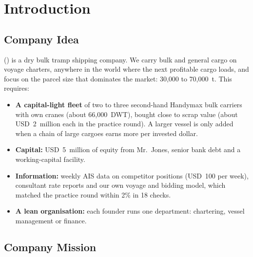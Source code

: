 \chapter{Introduction}\label{ch:introduction}

\section{Company Idea}\label{sec:idea}

\company{} (\companyshort{}) is a dry bulk tramp shipping company. We carry bulk and general cargo on voyage charters, anywhere in the world where the next profitable cargo loads, and focus on the parcel size that dominates the market: 30,000 to 70,000~t. This requires:
\begin{itemize}
  \item \textbf{A capital-light fleet} of two to three second-hand Handymax bulk carriers with own cranes (about 66,000~DWT), bought close to scrap value (about USD~2~million each in the practice round). A larger vessel is only added when a chain of large cargoes earns more per invested dollar.
  \item \textbf{Capital:} USD~5~million of equity from Mr.\ Jones, senior bank debt and a working-capital facility.
  \item \textbf{Information:} weekly AIS data on competitor positions (USD~100 per week), consultant rate reports and our own voyage and bidding model, which matched the practice round within 2\% in 18 checks.
  \item \textbf{A lean organisation:} each founder runs one department: chartering, vessel management or finance.
\end{itemize}

\section{Company Mission}\label{sec:mission}

